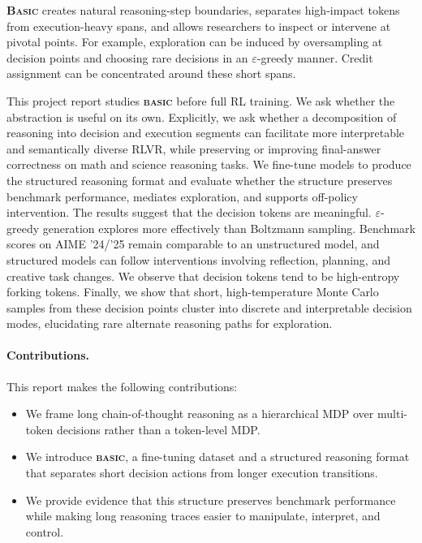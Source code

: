 \documentclass[10pt,twocolumn]{article}
\newcommand{\methodnamestart}{\textbf{\textsf{\textsc{Basic}}}}
\newcommand{\methodname}{\textbf{\textsf{\textsc{basic}}}}
\newcommand{\methodnamestart}{{\sffamily\bfseries B{\fontsize{0.9em}{0.9em}\selectfont ASIC}}}
\newcommand{\methodname}{{\sffamily\bfseries{\fontsize{0.95em}{0.95em}\selectfont BASIC}}}
\begin{document}
\methodnamestart{} creates natural reasoning-step boundaries, separates
high-impact tokens from
execution-heavy spans, and allows researchers to inspect or intervene at pivotal
points. For example, exploration can be induced by oversampling at decision points and
choosing rare decisions in an \(\varepsilon\)-greedy manner. Credit assignment can be
concentrated around these short spans.

This project report studies \methodname{} before full RL training. We ask
whether the abstraction is useful on its own. Explicitly, we ask whether a
decomposition of reasoning into decision and execution segments can facilitate more
interpretable and semantically diverse RLVR, while preserving or improving
final-answer correctness on math and science reasoning tasks. We fine-tune models
to produce the structured reasoning format and evaluate whether the structure
preserves benchmark performance, mediates exploration, and supports off-policy
intervention. The results suggest that the decision tokens are meaningful.
\(\varepsilon\)-greedy generation explores more effectively than Boltzmann sampling.
Benchmark scores on AIME '24/'25 remain comparable to an unstructured model, and
structured models can follow interventions involving reflection, planning, and
creative task changes. We observe that decision tokens tend to be high-entropy
forking tokens. Finally, we show that short, high-temperature Monte Carlo
samples from
these decision points cluster into discrete and interpretable decision modes,
elucidating rare alternate reasoning paths for exploration.

\paragraph{Contributions.}
This report makes the following contributions:
\begin{itemize}
  \item We frame long chain-of-thought reasoning as a hierarchical MDP over multi-token
        decisions rather than a token-level MDP.
  \item We introduce \methodname{}, a fine-tuning dataset and a structured
        reasoning
        format that separates short decision actions from longer execution transitions.
  \item We provide evidence that this structure preserves benchmark
        performance while making long reasoning traces easier to manipulate,
        interpret, and control.
\end{itemize}
\end{document}
